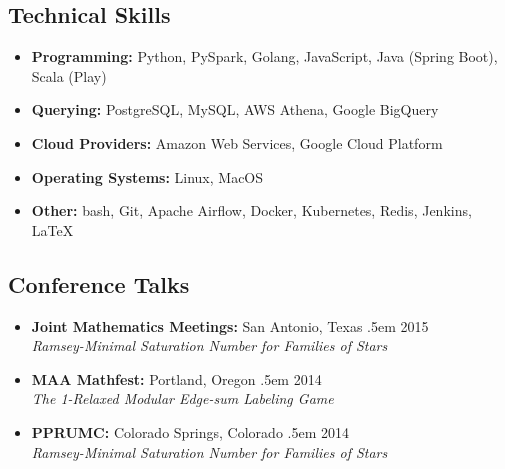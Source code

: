 \documentclass[a4paper]{article}
\makeatletter
\newcommand \brentfill {
  \tiny
  \leavevmode \cleaders 
  \hb@xt@ .5em{\hss \textperiodcentered \hss }\hfill \kern \z@
  \normalsize
}
\newcommand{\bbull}{\ding{118}}
\makeatother
\begin{document}
\subsection*{Technical Skills \hrulefill}
\begin{itemize}
  \item[\bbull] \textbf{Programming:}  Python, PySpark, Golang,
    JavaScript, Java (Spring Boot), Scala (Play)
  \item[\bbull] \textbf{Querying:} PostgreSQL, MySQL, AWS Athena, Google
    BigQuery
  \item[\bbull] \textbf{Cloud Providers:} Amazon Web Services, Google
    Cloud Platform
  \item[\bbull] \textbf{Operating Systems:}  Linux, MacOS
  \item[\bbull] \textbf{Other:}  bash, Git, Apache Airflow, Docker, Kubernetes,
    Redis, Jenkins, \LaTeX
\end{itemize}


\subsection*{Conference Talks \hrulefill}
\begin{itemize}
  \item[\bbull] \textbf{Joint Mathematics Meetings:}
    San Antonio, Texas \brentfill{} 2015 \\
    \emph{Ramsey-Minimal Saturation Number for Families of Stars}

  \item[\bbull] \textbf{MAA Mathfest:}
    Portland, Oregon \brentfill{} 2014 \\
    \emph{The 1-Relaxed Modular Edge-sum Labeling Game}

  \item[\bbull] \textbf{PPRUMC:}
    Colorado Springs, Colorado \brentfill{} 2014 \\
    \emph{Ramsey-Minimal Saturation Number for Families of Stars}
\end{itemize}

\begingroup
\renewcommand{\section}[2]{\subsection#1{#2}}%
\nocite{brandt:local,butler:forest,ferrara:ramseyus}


\endgroup
\end{document}
